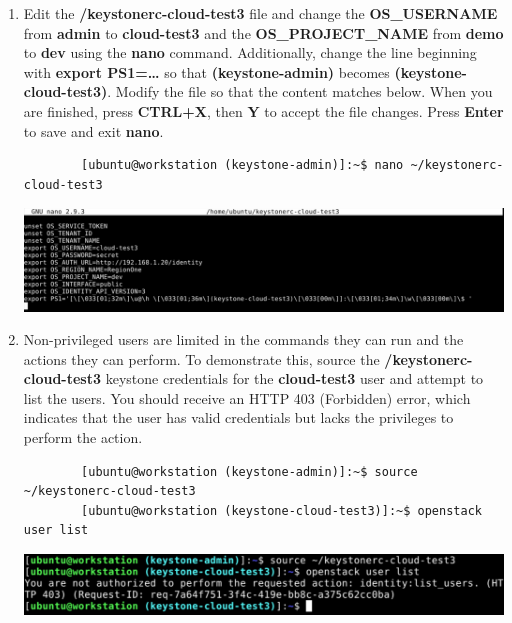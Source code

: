 \documentclass[letterpaper, 12pt]{article}
\begin{document}
\begin{enumerate}
    \item Edit the \textbf{\texttildemid/keystonerc-cloud-test3} file and change the \textbf{OS\_USERNAME} from
    \textbf{admin} to \textbf{cloud-test3} and the \textbf{OS\_PROJECT\_NAME} from \textbf{demo} to \textbf{dev} using the
    \textbf{nano} command. Additionally, change the line beginning with \textbf{export PS1=…} so that
    \textbf{(keystone-admin)} becomes \textbf{(keystone-cloud-test3)}. Modify the file so that the content matches below. When
    you are finished, press \textbf{CTRL+X}, then \textbf{Y} to accept the file changes. Press \textbf{Enter} to save
    and exit \textbf{nano}.
    \label{it:edit_keystone}
    \begin{lstlisting}
        [ubuntu@workstation (keystone-admin)]:~$ nano ~/keystonerc-cloud-test3
    \end{lstlisting}

    \begin{center}
        \includegraphics[width=\linewidth]{images/part4/step12.png}
    \end{center}

    \item Non-privileged users are limited in the commands they can run and the actions they can perform.
    To demonstrate this, source the \textbf{\texttildemid/keystonerc-cloud-test3} keystone credentials for the \textbf{cloud-test3} user and attempt to list the users.
    You should receive an HTTP 403 (Forbidden) error, which indicates that the user has valid credentials but lacks the privileges to perform the action.
    \begin{lstlisting}
        [ubuntu@workstation (keystone-admin)]:~$ source ~/keystonerc-cloud-test3
        [ubuntu@workstation (keystone-cloud-test3)]:~$ openstack user list
    \end{lstlisting}

    \begin{center}
        \includegraphics[width=\linewidth]{images/part4/step13.png}
    \end{center}


\end{enumerate}
\end{document}
